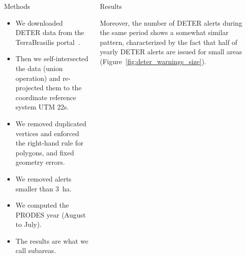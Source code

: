 \documentclass[20pt]{beamer}
\begin{document}
\begin{frame}[fragile,t]
\begin{columns}[t]
\begin{column}{0.33\linewidth}
\vspace{1cm}

    \begin{block}{Methods}

        \begin{itemize}
            \item We downloaded DETER data from the TerraBrasilis portal~\cite{f.g.assis2019}. 
            \item Then we self-intersected the data (union operation) and re-projected them to the coordinate reference system UTM 22s.
            \item We removed duplicated vertices and enforced the right-hand rule for polygons, and fixed geometry errors.
            \item We removed alerts smaller than 3~ha.
            \item We computed the PRODES year (August to July).
            \item The results are what we call subareas.
        \end{itemize}




    \end{block}

        \vspace{1cm}

\end{column}



\begin{column}{0.33\linewidth}
\vspace{1cm}
    \begin{block}{Results\vphantom{g}}


Moreover, the number of DETER alerts during the same period shows a somewhat similar pattern, characterized by the fact that half of yearly DETER alerts are issued for small areas (Figure~\ref{fig:deter_warnings_size}).


\end{block}
\end{column}
\end{columns}
\end{frame}
\end{document}
